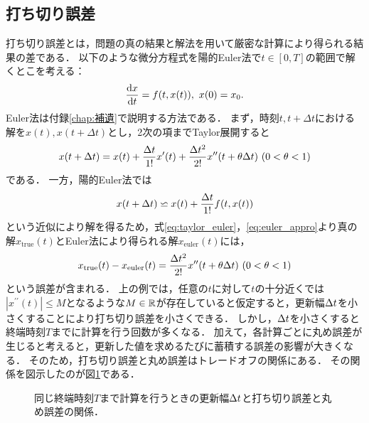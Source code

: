 \subsection{打ち切り誤差}
打ち切り誤差とは，問題の真の結果と解法を用いて厳密な計算により得られる結果の差である．
以下のような微分方程式を陽的Euler法で$t \in [0,T]$の範囲で解くとこを考える：
\begin{equation*}
    \frac{\mathrm{d}x}{\mathrm{d}t} = f(t,x(t)), \ x(0) = x_0.
\end{equation*}
Euler法は付録\ref{chap:補遺}で説明する方法である．
まず，時刻$t,t+\Delta t$における解を$x(t),x(t+\Delta t)$とし，2次の項までTaylor展開すると
\begin{align}
    \label{eq:taylor_euler}
    x(t + \Delta t) = x(t) + \frac{\Delta t}{1!}x^{\prime}(t) + \frac{\Delta t^2}{2!}x^{\prime\prime}(t + \theta\Delta t) \ (0 < \theta < 1)
\end{align}
である．
一方，陽的Euler法では
\begin{align}
    \label{eq:euler_appro}
    x(t + \Delta t) \backsimeq x(t) + \frac{\Delta t}{1!}f(t,x(t))
\end{align}
という近似により解を得るため，式\eqref{eq:taylor_euler}，\eqref{eq:euler_appro}より真の解$x_{\mathrm{true}}(t)$とEuler法により得られる解$x_{\mathrm{euler}}(t)$には，
\begin{align*}
    x_{\mathrm{true}}(t) - x_{\mathrm{euler}}(t) = \frac{\Delta t^2}{2!}x^{\prime\prime}(t + \theta\Delta t) \ (0 < \theta < 1)
\end{align*}
という誤差が含まれる．
上の例では，任意の$t$に対して$t$の十分近くでは$|x^{\prime\prime}(t)| \leq M$となるような$M \in \mathbb{R}$が存在していると仮定すると，更新幅$\Delta t$を小さくすることにより打ち切り誤差を小さくできる．
しかし，$\Delta t$を小さくすると終端時刻$T$までに計算を行う回数が多くなる．
加えて，各計算ごとに丸め誤差が生じると考えると，更新した値を求めるたびに蓄積する誤差の影響が大きくなる．
そのため，打ち切り誤差と丸め誤差はトレードオフの関係にある．
その関係を図示したのが図\ref{fig:error_tradingoff}である．
\begin{figure}[H]
    \centering
    \caption{同じ終端時刻$T$まで計算を行うときの更新幅$\Delta t$と打ち切り誤差と丸め誤差の関係．}
    \label{fig:error_tradingoff}
\end{figure}

